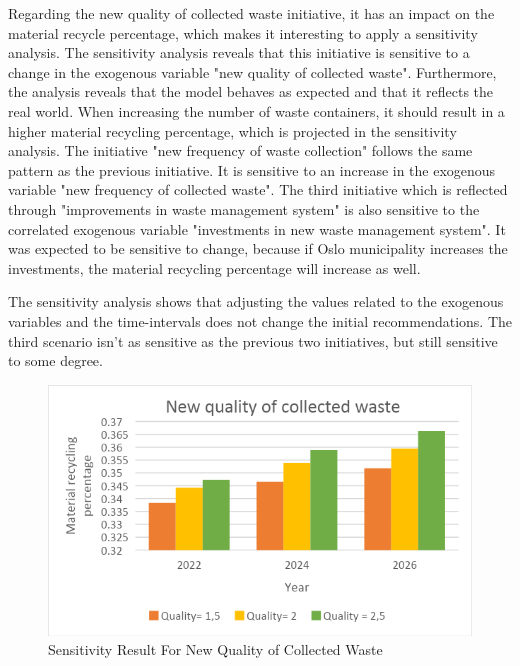 \indent \newline
Regarding the new quality of collected waste initiative, it has an impact on the material recycle percentage, which makes it interesting to apply a sensitivity analysis. The sensitivity analysis reveals that this initiative is sensitive to a change in the exogenous variable "new quality of collected waste". Furthermore, the analysis reveals that the model behaves as expected and that it reflects the real world. When increasing the number of waste containers, it should result in a higher material recycling percentage, which is projected in the sensitivity analysis. The initiative "new frequency of waste collection" follows the same pattern as the previous initiative. It is sensitive to an increase in the exogenous variable "new frequency of collected waste". The third initiative which is reflected through "improvements in waste management system" is also sensitive to the correlated exogenous variable "investments in new waste management system". It was expected to be sensitive to change, because if Oslo municipality increases the investments, the material recycling percentage will increase as well. 

\indent \newline
The sensitivity analysis shows that adjusting the values related to the exogenous variables and the time-intervals does not change the initial recommendations. The third scenario isn't as sensitive as the previous two initiatives, but still sensitive to some degree. 

\begin{figure}[H]
\centering
\includegraphics [scale=0.40,angle=360]{figures/sensitivitynew.png}
\caption{Sensitivity Result For New Quality of Collected Waste}
\label{fig:sensitivitynew}
\end{figure}

